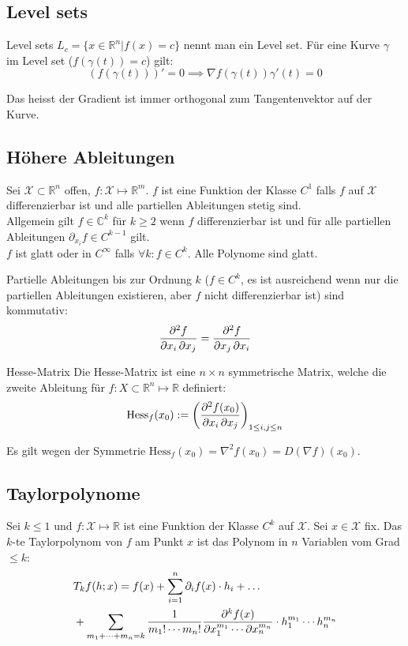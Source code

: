 \documentclass[a4paper,10pt]{article}
\def\R{\mathbb{R}}
\def\C{\mathbb{C}}
\def\X{\mathcal{X}}
\begin{document}
\subsection{Level sets}

\begin{mainbox}{Level sets}
  $L_c = \{ x \in \mathbb{R}^n | f(x) = c \}$ nennt man ein Level set.
  Für eine Kurve $\gamma$ im Level set ($f(\gamma(t)) = c$) gilt:
  $$(f(\gamma(t)))' = 0 \implies \nabla f(\gamma(t)) \gamma'(t) = 0$$
\end{mainbox}

Das heisst der Gradient ist immer orthogonal zum Tangentenvektor auf der Kurve.

\subsection{Höhere Ableitungen}
Sei \(\X \subset \R^n\) offen, \(f: \X \mapsto \R^m\). \(f\) ist eine Funktion der Klasse \(C^1\) falls \(f\) auf \(\X\) differenzierbar ist und alle partiellen Ableitungen stetig sind. \\
Allgemein gilt \(f \in \C^k\) für \(k \ge 2\) wenn \(f\) differenzierbar ist und für alle partiellen Ableitungen \(\partial_{x_i} f \in C^{k-1}\) gilt. \\
\(f\) ist glatt oder in \(C^\infty\) falls \(\forall k: f \in C^k \). Alle Polynome sind glatt.

Partielle Ableitungen bis zur Ordnung \(k\) ($f \in C^k$, es ist ausreichend wenn nur die partiellen Ableitungen existieren, aber $f$ nicht differenzierbar ist) sind kommutativ:
$$\pdv{f}{x_i, x_j} = \pdv{f}{ x_j, x_i}$$

\begin{mainbox}{Hesse-Matrix}
  Die Hesse-Matrix ist eine \(n \times n\) symmetrische Matrix, welche die zweite Ableitung für $f: X \subset \mathbb{R}^n \mapsto \mathbb{R}$ definiert:
  \[\text{Hess}_f(x_0) := \left(\pdv{f(x_0)}{x_i, x_j}\right)_{1\le i,j \le n}\] 
\end{mainbox}

Es gilt wegen der Symmetrie $\text{Hess}_f(x_0) = \nabla^2 f(x_0) = D(\nabla f)(x_0)$.

\subsection{Taylorpolynome}
Sei \(k \le 1\) und \(f: \X \mapsto \R\) ist eine Funktion der Klasse \(C^k\) auf \(\X\). Sei \(x \in \X\) fix. Das \(k\)-te Taylorpolynom von \(f\) am Punkt \(x\) ist das Polynom in \(n\) Variablen vom Grad \(\le k\):
\begin{align*}
  &T_k f(h; x) = f(x) + \sum_{i=1}^n \partial_i f(x) \cdot h_i + \dots \\
  &+ \sum_{m_1 + \cdots + m_n = k} \frac{1}{m_1! \cdots m_n!} \pdv{^k f(x) }{x_1^{m_1} \cdots \partial x_n^{m_n}} \cdot h_1^{m_1} \cdots h_n^{m_n}
\end{align*}
\end{document}
